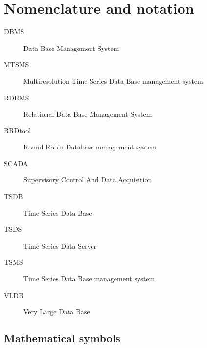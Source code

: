\section{Nomenclature and notation}\label{sec:notation}

\begin{description}
\item[DBMS] Data Base Management System
\item[MTSMS] Multiresolution Time Series Data Base management system
\item[RDBMS] Relational Data Base Management System
\item[RRDtool] Round Robin Database management system \parencite{rrdtool}
\item[SCADA] Supervisory Control And Data Acquisition
\item[TSDB] Time Series Data Base
\item[TSDS] Time Series Data Server \parencite{weigel10}
\item[TSMS] Time Series Data Base management system
\item[VLDB] Very Large Data Base 
\end{description}

\subsection{Mathematical symbols}



